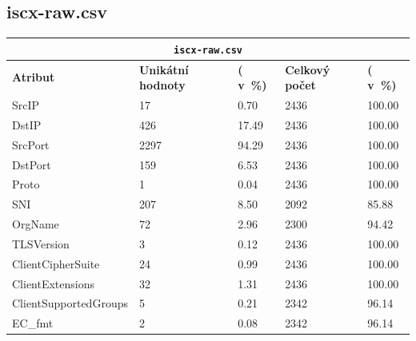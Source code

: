 \subsection{iscx-raw.csv}
\begin{table}[h!]
	\centering
	\begin{tabular}{lllll}
		\toprule
		\multicolumn{5}{c}{\texttt{iscx-raw.csv}} \\
		\midrule
		\textbf{Atribut}        & \textbf{Unikátní hodnoty} & \textbf{( v~\%)} & \textbf{Celkový počet} & \textbf{( v~\%)} \\
		\midrule
		SrcIP                   & 17                                  & 0.70             & 2436                     & 100.00           \\
		DstIP                   & 426                                 & 17.49            & 2436                     & 100.00           \\
		SrcPort                 & 2297                                & 94.29            & 2436                     & 100.00           \\
		DstPort                 & 159                                 & 6.53             & 2436                     & 100.00           \\
		Proto                   & 1                                   & 0.04             & 2436                     & 100.00           \\
		SNI                     & 207                                 & 8.50             & 2092                     & 85.88            \\
		OrgName                 & 72                                  & 2.96             & 2300                     & 94.42            \\
		TLSVersion              & 3                                   & 0.12             & 2436                     & 100.00           \\
		ClientCipherSuite       & 24                                  & 0.99             & 2436                     & 100.00           \\
		ClientExtensions        & 32                                  & 1.31             & 2436                     & 100.00           \\
		ClientSupportedGroups   & 5                                   & 0.21             & 2342                     & 96.14            \\
		EC\_fmt                 & 2                                   & 0.08             & 2342                     & 96.14            \\

\end{tabular}
\end{table}
